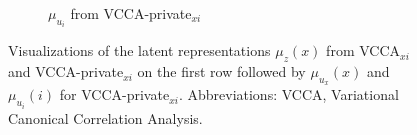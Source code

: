 \begin{figure}[th!]
\begin{minipage}{0.8\textwidth}
\begin{subfigure}[t]{0.75\textwidth}
			\caption{$\mu_{u_{i}}$ from VCCA-private$_{x i}$}
			\label{fig:pca_vcca_private_xi_ui}
		\end{subfigure}
	\end{minipage}
	\caption{Visualizations of the latent representations $\mu_{z}(x)$ from VCCA$_{x i}$ and VCCA-private$_{x i}$ on the first row followed by $\mu_{u_{x}}(x)$ and $\mu_{u_{i}}(i)$ for VCCA-private$_{x i}$. Abbreviations: VCCA, Variational Canonical Correlation Analysis.}
	\label{paperB:fig:2d_visualizations_pca_vcca_private_xi}
\end{figure}

\clearpage